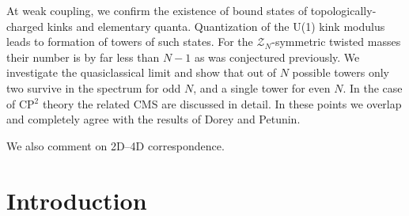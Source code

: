 \documentclass[epsfig,12pt]{article}
\newcommand{\mc}[1]{\mathcal{#1}}
\begin{document}
\begin{titlepage}
	At weak coupling, we confirm the existence of bound states 
	of topologically-charged kinks and elementary quanta. 
	Quantization of the U(1) kink modulus leads to formation of towers of such states. 
	For the $ \mc{Z}_N $-symmetric twisted masses
	their number is by far less than $ N - 1 $ as was conjectured previously.
	We investigate  the quasiclassical limit and show that out of $ N $ possible towers  
	only two survive in the spectrum for odd $ N $, and a single tower for even $ N $.
	In the case of CP$^2$ theory the related CMS are discussed in detail.
	In these points we overlap and completely agree with the results of  Dorey and Petunin.

	We also comment on 2D--4D correspondence. 


\end{titlepage}

\newpage

\tableofcontents

\newpage

\section{Introduction}
\setcounter{equation}{0}
\end{document}
